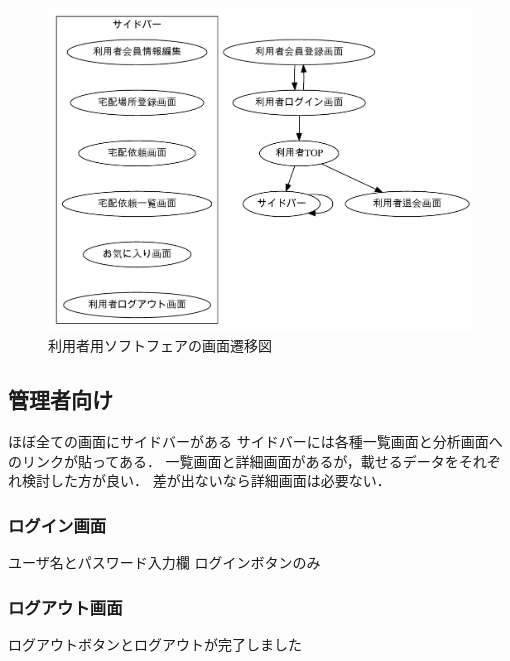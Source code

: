 \documentclass[a4paper, titlepage]{jsarticle}
\begin{document}
\begin{figure}[H]
  \centering
  \includegraphics[width=\linewidth]{other/user.pdf}
  \caption{利用者用ソフトフェアの画面遷移図}
  \label{fig:user_diagram}
\end{figure}

\subsection{管理者向け}
ほぼ全ての画面にサイドバーがある
サイドバーには各種一覧画面と分析画面へのリンクが貼ってある．
一覧画面と詳細画面があるが，載せるデータをそれぞれ検討した方が良い．
差が出ないなら詳細画面は必要ない．
\subsubsection{ログイン画面}
ユーザ名とパスワード入力欄
ログインボタンのみ
\subsubsection{ログアウト画面}
ログアウトボタンとログアウトが完了しました

\end{document}
